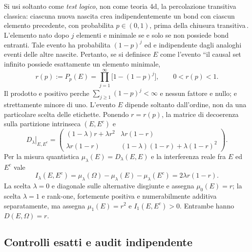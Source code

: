 \documentclass[11pt,a4paper]{article}
\begin{document}
Si usi soltanto come \emph{test logico}, non come teoria 4d, la percolazione
transitiva classica: ciascuna nuova nascita crea indipendentemente un bond con
ciascun elemento precedente, con probabilita $p\in(0,1)$, prima della chiusura
transitiva\,\cite{RideoutSorkin2000}. L'elemento nato dopo $j$ elementi e minimale
se e solo se non possiede bond entranti. Tale evento ha probabilita $(1-p)^j$ ed
e indipendente dagli analoghi eventi delle altre nascite. Pertanto, se
si definisce $E$ come l'evento ``il causal set infinito possiede esattamente un elemento minimale,
\begin{equation}
 \boxed{r(p):=P_p(E)=\prod_{j=1}^{\infty}\bigl[1-(1-p)^j\bigr],\qquad 0<r(p)<1.}
 \label{eq:r12aq_minimal}
\end{equation}
Il prodotto e positivo perche $\sum_{j\ge1}(1-p)^j<\infty$ e nessun fattore
e nullo; e strettamente minore di uno. L'evento $E$ dipende soltanto dall'ordine,
non da una particolare scelta delle etichette. Ponendo $r=r(p)$, la matrice di
decoerenza sulla partizione intrinseca $(E,E^c)$ e
\begin{equation}
 \left.D_\lambda\right|_{E,E^c}=
 \begin{pmatrix}
 (1-\lambda)r+\lambda r^2 & \lambda r(1-r)\\
 \lambda r(1-r) & (1-\lambda)(1-r)+\lambda(1-r)^2
 \end{pmatrix}.
 \label{eq:r12aq_two_event}
\end{equation}
Per la misura quantistica $\mu_\lambda(E)=D_\lambda(E,E)$ e la
interferenza reale fra $E$ ed $E^c$ vale
\begin{equation}
 \boxed{I_\lambda(E,E^c)=\mu_\lambda(\Omega)-\mu_\lambda(E)-\mu_\lambda(E^c)
 =2\lambda r(1-r).}
 \label{eq:r12aq_interference}
\end{equation}
La scelta $\lambda=0$ e diagonale sulle alternative disgiunte e assegna
$\mu_0(E)=r$; la scelta $\lambda=1$ e rank-one, fortemente positiva e
numerabilmente additiva separatamente, ma assegna $\mu_1(E)=r^2$ e
$I_1(E,E^c)>0$. Entrambe hanno $D(E,\Omega)=r$.

\subsection{Controlli esatti e audit indipendente}
\end{document}
